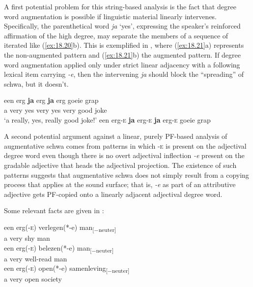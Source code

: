 \documentclass[output=paper]{langsci/langscibook}
\begin{document}
A first potential problem for this string-based analysis is the fact that
degree word augmentation is possible if linguistic material linearly
intervenes. Specifically, the parenthetical word \emph{ja} \enquote*{yes},
expressing the speaker's reinforced affirmation of the high degree, may
separate the members of a sequence of iterated  like
(\ref{ex:18.20}b). This is exemplified in , where
(\ref{ex:18.21}a) represents the non-augmented pattern and (\ref{ex:18.21}b) the
augmented pattern. If degree word augmentation applied only under strict linear
adjacency with a following lexical item carrying \emph{-e}, then the
intervening \emph{ja} should block the \enquote{spreading} of schwa, but it
doesn't.

\ea%
    \label{ex:18.21}
	\ea
	\gll een  erg   \textbf{ja}      erg      \textbf{ja}      erg      goeie    grap\\
		a        very    yes    very    yes    very    good    joke\\
	\glt \enquote*{a really, yes, really good joke!}
	\ex een erg-\textsc{e} \textbf{ja} erg-\textsc{e} \textbf{ja} erg\textsc{-e} goeie grap
	\z
\z

A second potential argument against a linear, purely \gls{PF}-based analysis of
augmentative schwa comes from patterns in which \textsc{-e} is present on the
adjectival degree word even though there is no overt adjectival inflection
\emph{-e} present on the gradable adjective that heads the adjectival
projection. The existence of such patterns suggests that augmentative schwa
does not simply result from a copying process that applies at the sound
surface; that is, \emph{-e} as part of an attributive adjective gets \gls{PF}-copied
onto a linearly adjacent adjectival degree word.

Some relevant facts are given in :

\ea%
    \label{ex:18.22}
	\ea
	\gll een  erg(-\textsc{e})    verlegen(*-e)  man\textsubscript{[−neuter]}\\
		a        very        shy                    man\\
	\ex
	\gll   een    erg(-\textsc{e})    belezen(*-e)    man\textsubscript{[−neuter]}\\
		 a        very        well-read        man\\
	\ex
	\gll  een  erg(-\textsc{e})    open(*-e)    samenleving\textsubscript{[−neuter]}\\
		 a        very        open            society\\
	\z
\z
\end{document}
